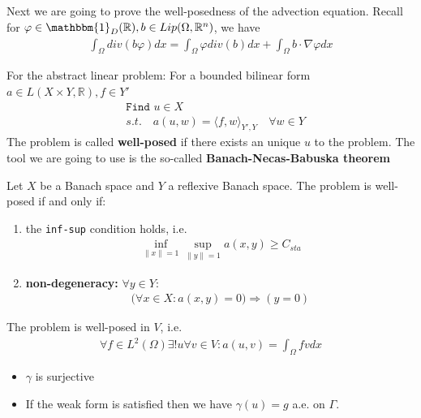 Next we are going to prove the well-posedness of the advection equation. Recall for $\varphi \in \mathbbm{1}_{D}(\mathbb{R}), b \in Lip(\Omega, \mathbb{R}^n)$, we have
\begin{align*}
	\int_\Omega div(b \varphi ) dx = \int_\Omega \varphi div(b) dx + \int_\Omega b \cdot \nabla \varphi dx 
\end{align*}




For the abstract linear problem: For a bounded bilinear form $a \in L(X \times Y, \mathbb{R}), f \in Y'$
\begin{align*}
	&\texttt{Find } u \in X\\
	&s.t.\quad a(u, w) = \langle f, w \rangle_{Y', Y} \quad \forall w \in Y 
\end{align*}
The problem is called \textbf{well-posed} if there exists an unique $u$ to the problem. 
The tool we are going to use is the so-called \textbf{Banach-Necas-Babuska theorem}

\begin{theorem}
	Let $X$ be a Banach space and $Y$ a reflexive Banach space. The problem is well-posed if and only if:
	\begin{enumerate}
		\item the \texttt{inf-sup} condition holds, i.e.
		\begin{align*}
			\inf_{\|x\| = 1} \sup_{\|y\|= 1} a(x, y) \geq C_{sta}
		\end{align*}
		\item \textbf{non-degeneracy:}  $\forall y \in Y$:
		\begin{align*}
			\bigg(\forall x \in X:a(x, y) = 0 \bigg)\Rightarrow (y = 0)
		\end{align*}
	\end{enumerate}
\end{theorem}

\begin{theorem}
	The problem is well-posed in $V$, i.e. 
	\begin{align*}
		\forall f \in L^2(\Omega) \exists! u \forall v \in V: a(u, v) = \int_\Omega fv dx
	\end{align*}
\end{theorem}
\begin{remark}
\quad
\begin{itemize}
	\item $\gamma$ is surjective
	\item If the weak form is satisfied then we have $\gamma(u) = g$ a.e. on $\Gamma$. 
\end{itemize}
\end{remark}


